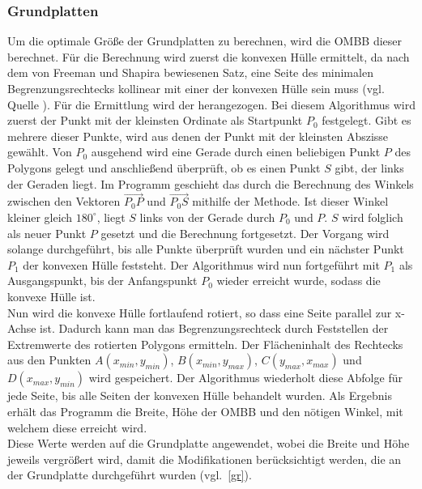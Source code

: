 \subsubsection{Grundplatten}
Um die optimale Größe der Grundplatten zu berechnen, wird die OMBB dieser berechnet.
Für die Berechnung wird zuerst die konvexen Hülle ermittelt, da nach dem von Freeman und Shapira bewiesenen Satz, eine Seite des minimalen Begrenzungsrechtecks kollinear mit einer der konvexen Hülle sein muss (vgl. Quelle \cite{ombb}).
Für die Ermittlung wird der  herangezogen.
Bei diesem Algorithmus wird zuerst der Punkt mit der kleinsten Ordinate als Startpunkt $P_0$ festgelegt.
Gibt es mehrere dieser Punkte, wird aus denen der Punkt mit der kleinsten Abszisse gewählt.
Von $P_0$ ausgehend wird eine Gerade durch einen beliebigen Punkt $P$ des Polygons gelegt und anschließend überprüft, ob es einen Punkt $S$ gibt, der links der Geraden liegt.
Im Programm geschieht das durch die Berechnung des Winkels zwischen den Vektoren $\overrightarrow{{P_0}P}$ und $\overrightarrow{{P_0}S}$ mithilfe der  Methode.
Ist dieser Winkel kleiner gleich $180^\circ$, liegt $S$ links von der Gerade durch $P_0$ und $P$.
$S$ wird folglich als neuer Punkt $P$ gesetzt und die Berechnung fortgesetzt.
Der Vorgang wird solange durchgeführt, bis alle Punkte überprüft wurden und ein nächster Punkt $P_1$ der konvexen Hülle feststeht.
Der Algorithmus wird nun fortgeführt mit $P_1$ als Ausgangspunkt, bis der Anfangspunkt $P_0$ wieder erreicht wurde, sodass die konvexe Hülle  ist.\\
Nun wird die konvexe Hülle fortlaufend rotiert, so dass eine Seite parallel zur x-Achse ist.
Dadurch kann man das Begrenzungsrechteck durch Feststellen der Extremwerte des rotierten Polygons ermitteln.
Der Flächeninhalt des Rechtecks aus den Punkten $A(x_{min}, y_{min})$, $B(x_{min}, y_{max})$, $C(y_{max}, x_{max})$ und $D(x_{max}, y_{min})$ wird gespeichert.
Der Algorithmus wiederholt diese Abfolge für jede Seite, bis alle Seiten der konvexen Hülle behandelt wurden. %
Als Ergebnis erhält das Programm die Breite, Höhe der OMBB und den nötigen Winkel, mit welchem diese erreicht wird.\\
Diese Werte werden auf die Grundplatte angewendet, wobei die Breite und Höhe jeweils vergrößert wird, damit die Modifikationen berücksichtigt werden, die an der Grundplatte durchgeführt wurden (vgl.~\ref{gr}).